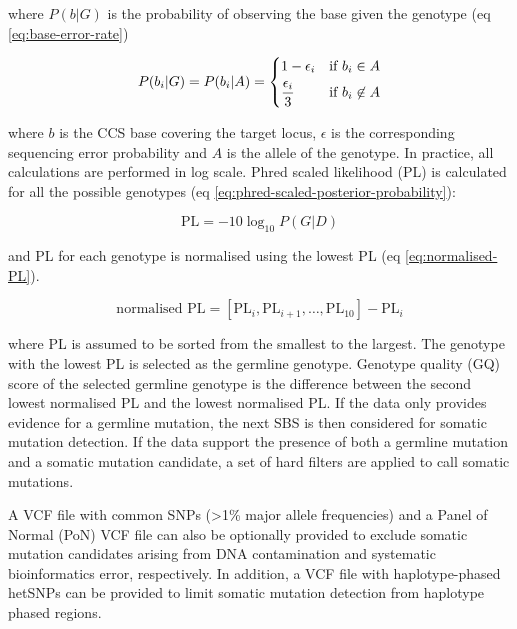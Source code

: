 where $P(b|G)$ is the probability of observing the base given the genotype (eq \ref{eq:base-error-rate})

\begin{equation} \label{eq:base-error-rate}
P(b_{i}|G) = P(b_{i}|A) = 
	\begin{dcases}
    	1 - \epsilon_{i} & \text{if } b_{i} \in A \\
	    \frac{\epsilon_{i}}{3} & \text{if } b_{i} \not\in A \\
	\end{dcases} \smallskip
\end{equation}

where $b$ is the CCS base covering the target locus, $\epsilon$ is the corresponding sequencing error probability and $A$ is the allele of the genotype. In practice, all calculations are performed in log scale. Phred scaled likelihood (PL) is calculated for all the possible genotypes (eq \ref{eq:phred-scaled-posterior-probability}):

\begin{equation} \label{eq:phred-scaled-posterior-probability}
\text{PL} = -10\log_{10}P(G|D) 
\end{equation}

and PL for each genotype is normalised using the lowest PL (eq \ref{eq:normalised-PL}).

\begin{equation} \label{eq:normalised-PL}
\text{normalised PL} = [\text{PL}_{i}, \text{PL}_{i+1}, \ldots, \text{PL}_{10}] - \text{PL}_{i}
\end{equation}

where PL is assumed to be sorted from the smallest to the largest. The genotype with the lowest PL is selected as the germline genotype. Genotype quality (GQ) score of the selected germline genotype is the difference between the second lowest normalised PL and the lowest normalised PL. If the data only provides evidence for a germline mutation, the next SBS is then considered for somatic mutation detection. If the data support the presence of both a germline mutation and a somatic mutation candidate, a set of hard filters are applied to call somatic mutations. 

A VCF file with common SNPs (>1\% major allele frequencies) and a Panel of Normal (PoN) VCF file can also be optionally provided to exclude somatic mutation candidates arising from DNA contamination and systematic bioinformatics error, respectively. In addition, a VCF file with haplotype-phased hetSNPs can be provided to limit somatic mutation detection from haplotype phased regions. 

